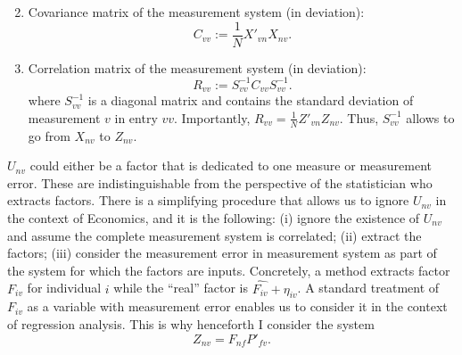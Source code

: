 \begin{enumerate}
\begin{equation}
\end{equation}
\item Covariance matrix of the measurement system (in deviation):\\
\begin{equation}
C_{vv} := \frac{1}{N} X'_{vn}X_{nv}.
\end{equation}
\item Correlation matrix of the measurement system (in deviation):\\
\begin{equation}
R_{vv} := S_{vv}^{-1} C_{vv} S_{vv}^{-1}. \label{eq:corrsysstd}
\end{equation}
\noindent where $S_{vv}^{-1}$ is a diagonal matrix and contains the standard deviation of measurement $v$ in entry $vv$. Importantly, $R_{vv} = \frac{1}{N} Z'_{vn}Z_{nv}$. Thus, $S_{vv}^{-1}$ allows to go from $X_{nv}$ to $Z_{nv}$. 
\end{enumerate}

\indent $U_{nv}$ could either be a factor that is dedicated to one measure or measurement error. These are indistinguishable from the perspective of the statistician who extracts factors. There is a simplifying procedure that allows us to ignore $U_{nv}$ in the context of Economics, and it is the following: (i) ignore the existence of $U_{nv}$ and assume the complete measurement system is correlated; (ii) extract the factors; (iii) consider the measurement error in measurement system as part of the system for which the factors are inputs. Concretely, a method extracts factor $F_{iv}$ for individual $i$ while the ``real'' factor is $\hat{F_{iv}} + \eta_{iv}$. A standard treatment of $F_{iv}$ as a variable with measurement error enables us to consider it in the context of regression analysis. This is why henceforth I consider the system
\begin{equation}
Z_{nv} = F_{nf} P'_{fv}.
\end{equation} 